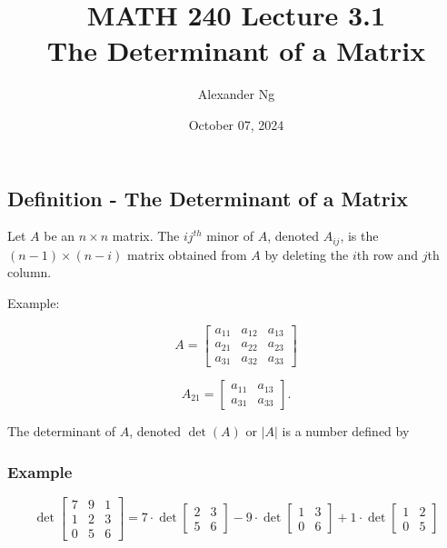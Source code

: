\documentclass[12pt]{article}
\begin{document}
\renewcommand{\arraystretch}{1.25} %
\setlength{\arraycolsep}{12pt} 

\title{MATH 240 Lecture 3.1\\The Determinant of a Matrix}
\author{Alexander Ng}
\date{October 07, 2024}

\maketitle

\subsection*{Definition - The Determinant of a Matrix}

Let $A$ be an $n \times n$ matrix. The $ij^{th}$ minor of $A$, denoted $A_{ij}$,
is the $(n-1)\times (n-i)$ matrix obtained from $A$ by deleting the $i$th row
and $j$th column.

Example:

\[
  A = \begin{bmatrix}
    a_{11} & a_{12} & a_{13}\\
    a_{21} & a_{22} & a_{23}\\
    a_{31} & a_{32} & a_{33} 
  \end{bmatrix}
\]

\[
  A_{21} = \begin{bmatrix}
    a_{11} & a_{13}\\
    a_{31} & a_{33}
  \end{bmatrix}
.\]

The determinant of $A$, denoted $\det(A)$ or $|A|$ is a number defined by

\subsubsection*{Example}

\[
  \det{
    \begin{bmatrix}
      7 & 9 & 1\\
      1 & 2 & 3 \\
      0 & 5 & 6
    \end{bmatrix}
  }
  =
  7 \cdot \det{
    \begin{bmatrix}
      2 & 3 \\
      5 & 6
    \end{bmatrix}
  }
  -
  9 \cdot \det{
    \begin{bmatrix}
      1 & 3 \\
      0 & 6
    \end{bmatrix}
  }
  +
  1 \cdot \det{
    \begin{bmatrix}
      1 & 2 \\
      0 & 5
    \end{bmatrix}
  }
\]
\end{document}
